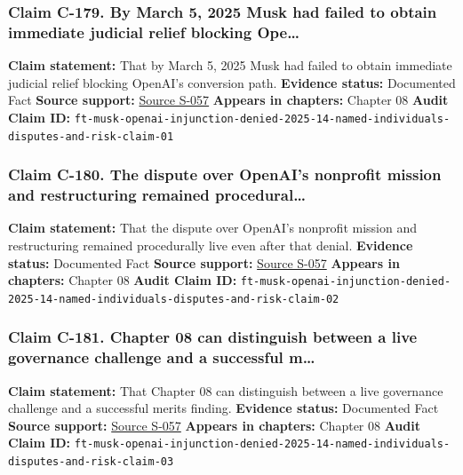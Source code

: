 \documentclass[
  american,
  11pt,
  letterpaper,
]{article}
\begin{document}
\subsubsection{Claim C-179. By March 5, 2025 Musk had failed to obtain
immediate judicial relief blocking
Ope\ldots{}}\label{claim-c-179-by-march-5-2025-musk-had-failed-to-obtain-immediate-judicial-relief-blocking-ope}

\textbf{Claim statement:} That by March 5, 2025 Musk had failed to
obtain immediate judicial relief blocking OpenAI's conversion path.
\textbf{Evidence status:} Documented Fact \textbf{Source support:}
\hyperref[source-s-057-judge-denies-elon-musks-attempt-to-immediately-block-openais-conversion-to-for-profit-entity]{Source
S-057} \textbf{Appears in chapters:} Chapter 08 \textbf{Audit Claim ID:}
\texttt{ft-musk-openai-injunction-denied-2025-14-named-individuals-disputes-and-risk-claim-01}

\subsubsection{Claim C-180. The dispute over OpenAI's nonprofit mission
and restructuring remained
procedural\ldots{}}\label{claim-c-180-the-dispute-over-openai-s-nonprofit-mission-and-restructuring-remained-procedural}

\textbf{Claim statement:} That the dispute over OpenAI's nonprofit
mission and restructuring remained procedurally live even after that
denial. \textbf{Evidence status:} Documented Fact \textbf{Source
support:}
\hyperref[source-s-057-judge-denies-elon-musks-attempt-to-immediately-block-openais-conversion-to-for-profit-entity]{Source
S-057} \textbf{Appears in chapters:} Chapter 08 \textbf{Audit Claim ID:}
\texttt{ft-musk-openai-injunction-denied-2025-14-named-individuals-disputes-and-risk-claim-02}

\subsubsection{Claim C-181. Chapter 08 can distinguish between a live
governance challenge and a successful
m\ldots{}}\label{claim-c-181-chapter-08-can-distinguish-between-a-live-governance-challenge-and-a-successful-m}

\textbf{Claim statement:} That Chapter 08 can distinguish between a live
governance challenge and a successful merits finding. \textbf{Evidence
status:} Documented Fact \textbf{Source support:}
\hyperref[source-s-057-judge-denies-elon-musks-attempt-to-immediately-block-openais-conversion-to-for-profit-entity]{Source
S-057} \textbf{Appears in chapters:} Chapter 08 \textbf{Audit Claim ID:}
\texttt{ft-musk-openai-injunction-denied-2025-14-named-individuals-disputes-and-risk-claim-03}
\end{document}
